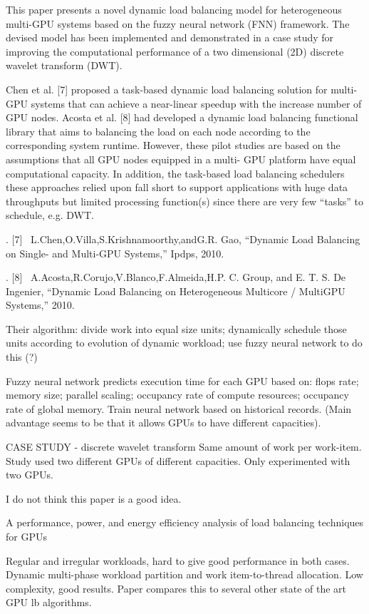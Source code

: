 \documentclass{article}
\begin{document}
This paper presents a novel dynamic load balancing model for heterogeneous multi-GPU systems based on the fuzzy neural network (FNN) framework. The devised model has been implemented and demonstrated in a case study for improving the computational performance of a two dimensional (2D) discrete wavelet transform (DWT). 

Chen et al. [7] proposed a task-based dynamic load balancing solution for multi-GPU systems that can achieve a near-linear speedup with the increase number of GPU nodes. Acosta et al. [8] had developed a dynamic load balancing functional library that aims to balancing the load on each node according to the corresponding system runtime. However, these pilot studies are based on the assumptions that all GPU nodes equipped in a multi- GPU platform have equal computational capacity. In addition, the task-based load balancing schedulers these approaches relied upon fall short to support applications with huge data throughputs but limited processing function(s) since there are very few “tasks” to schedule, e.g. DWT. 

	.	[7]  L.Chen,O.Villa,S.Krishnamoorthy,andG.R. Gao, “Dynamic Load Balancing on Single- and Multi-GPU Systems,” Ipdps, 2010.  

	.	[8]  A.Acosta,R.Corujo,V.Blanco,F.Almeida,H.P. C. Group, and E. T. S. De Ingenier, “Dynamic Load Balancing on Heterogeneous Multicore / MultiGPU Systems,” 2010.  

Their algorithm: divide work into equal size units; dynamically schedule those units according to evolution of dynamic workload; use fuzzy neural network to do this (?)

Fuzzy neural network predicts execution time for each GPU based on: flops rate; memory size; parallel scaling; occupancy rate of compute resources; occupancy rate of global memory.
Train neural network based on historical records.  (Main advantage seems to be that it allows GPUs to have different capacities).


CASE STUDY - discrete wavelet transform
Same amount of work per work-item.
Study used two different GPUs of different capacities.
Only experimented with two GPUs.

I do not think this paper is a good idea.


\cite{7993387}

A performance, power, and energy efficiency analysis of load balancing techniques for GPUs 

Regular and irregular workloads, hard to give good performance in both cases.
Dynamic multi-phase workload partition and work item-to-thread allocation.
Low complexity, good results.
Paper compares this to several other state of the art GPU lb algorithms.
\end{document}
